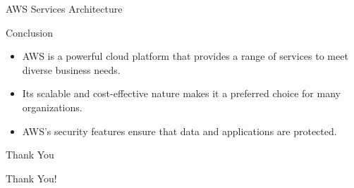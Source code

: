 \documentclass{beamer}
\begin{document}
\begin{frame}{AWS Services Architecture}
    \begin{center}
    \end{center}
\end{frame}

\begin{frame}{Conclusion}
    \begin{itemize}
        \item AWS is a powerful cloud platform that provides a range of services to meet diverse business needs.
        \item Its scalable and cost-effective nature makes it a preferred choice for many organizations.
        \item AWS’s security features ensure that data and applications are protected.
    \end{itemize}
\end{frame}

\begin{frame}{Thank You}
    \begin{center}
        \Huge \textcolor{awsorange}{Thank You!}
    \end{center}
    \vspace{1cm}

\end{frame}
\end{document}

